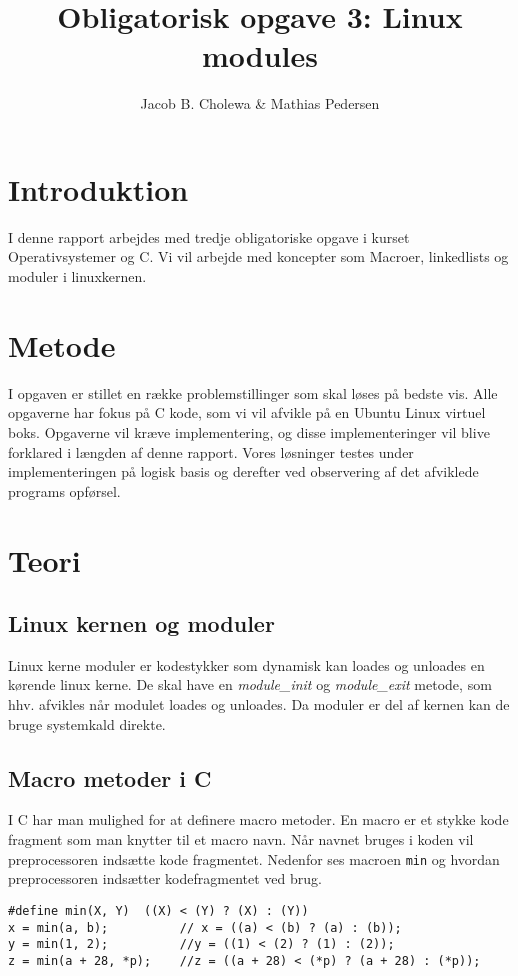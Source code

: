 \documentclass[danish]{report}
\title{Obligatorisk opgave 3: Linux modules}
\author{Jacob B. Cholewa \& Mathias Pedersen }
\begin{document}
\maketitle
\begingroup
\let\clearpage\relax
\chapter{Introduktion}
I denne rapport arbejdes med tredje obligatoriske opgave i kurset Operativsystemer og C. Vi vil arbejde med koncepter som Macroer, linkedlists og moduler i linuxkernen.

\vspace{20 mm}\chapter{Metode}
I opgaven er stillet en række problemstillinger som skal løses på bedste vis. Alle opgaverne har fokus på C kode, som vi vil afvikle på en Ubuntu Linux virtuel boks. Opgaverne vil kræve implementering, og disse implementeringer vil blive forklared i længden af denne rapport. Vores løsninger testes under implementeringen på logisk basis og derefter ved observering af det afviklede programs opførsel.
\endgroup
\chapter{Teori}
\section{Linux kernen og moduler}

Linux kerne moduler er kodestykker som dynamisk kan loades og unloades en kørende linux kerne. De skal have en \textit{module\_init} og \textit{module\_exit} metode, som hhv. afvikles når modulet loades og unloades. Da moduler er del af kernen kan de bruge systemkald direkte.

\section{Macro metoder i C}

I C har man mulighed for at definere macro metoder. En macro er et stykke kode fragment som man knytter til et macro navn. Når navnet bruges i koden vil preprocessoren indsætte kode fragmentet. Nedenfor ses macroen \texttt{min} og hvordan preprocessoren indsætter kodefragmentet ved brug.
\begin{lstlisting}
#define min(X, Y)  ((X) < (Y) ? (X) : (Y))
x = min(a, b);          // x = ((a) < (b) ? (a) : (b));
y = min(1, 2);          //y = ((1) < (2) ? (1) : (2));
z = min(a + 28, *p);    //z = ((a + 28) < (*p) ? (a + 28) : (*p));
\end{lstlisting}
\end{document}

